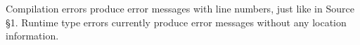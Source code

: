 Compilation errors produce error messages with line numbers, just like in Source \S 1.  Runtime type errors currently produce error messages without any location information.







\newpage


















